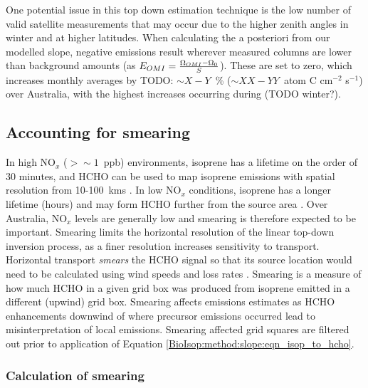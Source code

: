    
    One potential issue in this top down estimation technique is the low number of valid satellite measurements that may occur due to the higher zenith angles in winter and at higher latitudes.
    When calculating the a posteriori from our modelled slope, negative emissions result wherever measured columns are lower than background amounts (as $E_{OMI} = \frac{\Omega_{OMI} - \Omega_0}{S}$).
    These are set to zero, which increases monthly averages by TODO: $\sim X-Y$~\% ($\sim XX - YY$~atom C cm$^{-2}$ s$^{-1}$) over Australia, with the highest increases occurring during (TODO winter?).
    
  \subsection{Accounting for smearing}
    \label{BioIsop:method:smearing}
    
    In high NO$_x$ ($ > \sim 1 $~ppb) environments, isoprene has a lifetime on the order of 30 minutes, and HCHO can be used to map isoprene emissions with spatial resolution from 10-100~kms \parencite{Palmer2003}.
    In low NO$_x$ conditions, isoprene has a longer lifetime (hours) and may form HCHO further from the source area \parencite{Fan2004,Liu2016a,Liu2017_hpald}.
    Over Australia, NO$_x$ levels are generally low and smearing is therefore expected to be important.
    Smearing limits the horizontal resolution of the linear top-down inversion process, as a finer resolution increases sensitivity to transport.
    Horizontal transport \textit{smears} the HCHO signal so that its source location would need to be calculated using wind speeds and loss rates \parencite{Palmer2001,Palmer2003}.
    Smearing is a measure of how much HCHO in a given grid box was produced from isoprene emitted in a different (upwind) grid box.
    Smearing affects emissions estimates as HCHO enhancements downwind of where precursor emissions occurred lead to misinterpretation of local emissions.
    Smearing affected grid squares are filtered out prior to application of Equation \ref{BioIsop:method:slope:eqn_isop_to_hcho}.
    
    
    
    \subsubsection{Calculation of smearing}
      \label{BioIsop:method:smearing:calculation}
      
